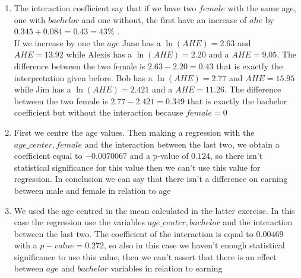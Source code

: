 \documentclass[10pt,a4paper]{article}
\begin{document}
\begin{enumerate}
	\item The interaction coefficient say that if we have two $ female $ with the same age, one with $ bachelor $ and one without, the first have an increase of $ ahe $ by $ 0.345 + 0.084 = 0.43 = 43\% $ .\\
	If we increase by one the $ age $  		
	Jane has a $ \ln(AHE) = 2.63 $ and $ AHE = 13.92 $ while Alexis has a $ \ln(AHE) = 2.20 $ and a $ AHE = 9.05 $. The difference between the two female is $ 2.63 - 2.20 = 0.43 $ that is exactly the interpretation given before.
	Bob has a $ \ln(AHE) = 2.77 $ and $ AHE = 15.95 $ while Jim has a $ \ln(AHE) = 2.421 $ and a $ AHE = 11.26 $. The difference between the two female is $ 2.77 - 2.421 = 0.349 $ that is exactly the bachelor coefficient but without the interaction because $ female = 0 $
	\item First we centre the age values. Then making a regression with the $ age\_center, female $ and the interaction between the last two, we obtain a coefficient equal to $ -0.0070067 $ and a p-value of $  0.124 $,  so there isn't statistical significance for this value then we can't use this value for regression. In conclusion we can say that there isn't a difference on earning between male and female in relation to age
	\item We used the age centred in the mean calculated in the latter exercise. In this case the regression use the variables  $ age\_center, bachelor $ and the interaction between the last two. The coefficient of the interaction is equal to $ 0.00469 $ with a $ p-value = 0.272 $, so also in this case we haven't enough statistical significance to use this value, then we can't assert that there is an effect between $ age $ and $ bachelor $ variables in relation to earning
	\end{enumerate}
\end{document}
